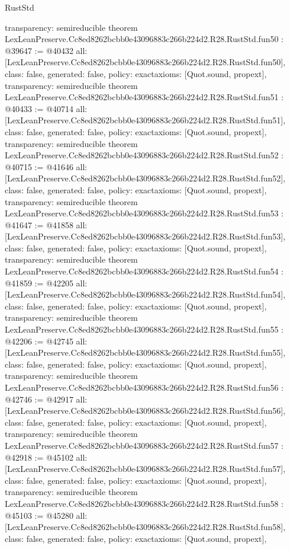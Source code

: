 \begin{lexlean}{RustStd}
\begin{coremodule}
{  transparency: semireducible
}
theorem LexLeanPreserve.Cc8ed8262bcbb0e43096883c266b224d2.R28.RustStd.fun50 : @39647 := @40432 {
  all: [LexLeanPreserve.Cc8ed8262bcbb0e43096883c266b224d2.R28.RustStd.fun50],
  class: false,
  generated: false,
  policy: exact{axioms: [Quot.sound, propext]},
  transparency: semireducible
}
theorem LexLeanPreserve.Cc8ed8262bcbb0e43096883c266b224d2.R28.RustStd.fun51 : @40433 := @40714 {
  all: [LexLeanPreserve.Cc8ed8262bcbb0e43096883c266b224d2.R28.RustStd.fun51],
  class: false,
  generated: false,
  policy: exact{axioms: [Quot.sound, propext]},
  transparency: semireducible
}
theorem LexLeanPreserve.Cc8ed8262bcbb0e43096883c266b224d2.R28.RustStd.fun52 : @40715 := @41646 {
  all: [LexLeanPreserve.Cc8ed8262bcbb0e43096883c266b224d2.R28.RustStd.fun52],
  class: false,
  generated: false,
  policy: exact{axioms: [Quot.sound, propext]},
  transparency: semireducible
}
theorem LexLeanPreserve.Cc8ed8262bcbb0e43096883c266b224d2.R28.RustStd.fun53 : @41647 := @41858 {
  all: [LexLeanPreserve.Cc8ed8262bcbb0e43096883c266b224d2.R28.RustStd.fun53],
  class: false,
  generated: false,
  policy: exact{axioms: [Quot.sound, propext]},
  transparency: semireducible
}
theorem LexLeanPreserve.Cc8ed8262bcbb0e43096883c266b224d2.R28.RustStd.fun54 : @41859 := @42205 {
  all: [LexLeanPreserve.Cc8ed8262bcbb0e43096883c266b224d2.R28.RustStd.fun54],
  class: false,
  generated: false,
  policy: exact{axioms: [Quot.sound, propext]},
  transparency: semireducible
}
theorem LexLeanPreserve.Cc8ed8262bcbb0e43096883c266b224d2.R28.RustStd.fun55 : @42206 := @42745 {
  all: [LexLeanPreserve.Cc8ed8262bcbb0e43096883c266b224d2.R28.RustStd.fun55],
  class: false,
  generated: false,
  policy: exact{axioms: [Quot.sound, propext]},
  transparency: semireducible
}
theorem LexLeanPreserve.Cc8ed8262bcbb0e43096883c266b224d2.R28.RustStd.fun56 : @42746 := @42917 {
  all: [LexLeanPreserve.Cc8ed8262bcbb0e43096883c266b224d2.R28.RustStd.fun56],
  class: false,
  generated: false,
  policy: exact{axioms: [Quot.sound, propext]},
  transparency: semireducible
}
theorem LexLeanPreserve.Cc8ed8262bcbb0e43096883c266b224d2.R28.RustStd.fun57 : @42918 := @45102 {
  all: [LexLeanPreserve.Cc8ed8262bcbb0e43096883c266b224d2.R28.RustStd.fun57],
  class: false,
  generated: false,
  policy: exact{axioms: [Quot.sound, propext]},
  transparency: semireducible
}
theorem LexLeanPreserve.Cc8ed8262bcbb0e43096883c266b224d2.R28.RustStd.fun58 : @45103 := @45280 {
  all: [LexLeanPreserve.Cc8ed8262bcbb0e43096883c266b224d2.R28.RustStd.fun58],
  class: false,
  generated: false,
  policy: exact{axioms: [Quot.sound, propext]},
}
\end{coremodule}
\end{lexlean}
